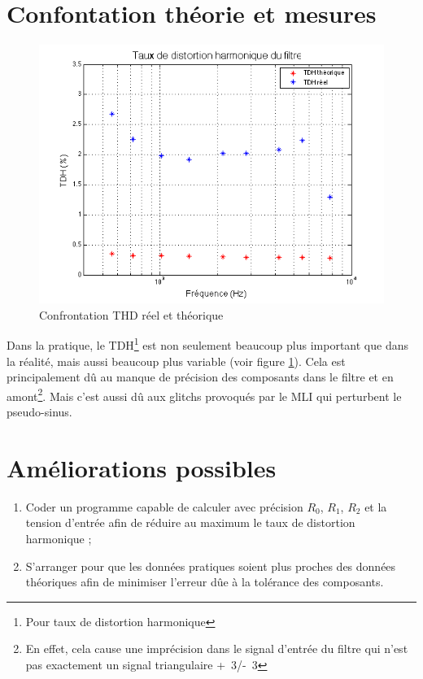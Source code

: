 \section{Confontation théorie et mesures}

\begin{figure}[ht]
	\centering
	\includegraphics[scale=0.3]{img-filter/THD.png}
	\caption{Confrontation THD réel et théorique}
	\label{fig:thd-filtre}
\end{figure}

Dans la pratique, le TDH\footnote{Pour taux de distortion harmonique} 
est non seulement beaucoup plus important que dans la réalité, mais aussi beaucoup plus 
variable (voir figure \ref{fig:thd-filtre}). Cela est principalement dû au manque de précision des composants dans le filtre
et en amont\footnote{En effet, cela cause une imprécision dans le signal d'entrée du filtre
qui n'est pas exactement un signal triangulaire \unit{+3}{\volt}/\unit{-3}{\volt}}. Mais c'est
aussi dû aux glitchs provoqués par le MLI qui perturbent le pseudo-sinus.

\section{Améliorations possibles}

\begin{enumerate}
	\item Coder un programme capable de calculer avec précision $R_0$, $R_1$, $R_2$ et la tension 
				d'entrée afin de réduire au maximum le taux de distortion harmonique ;
	\item S'arranger pour que les données pratiques soient plus proches des données théoriques afin 
				de minimiser l'erreur dûe à la tolérance des composants.
\end{enumerate}